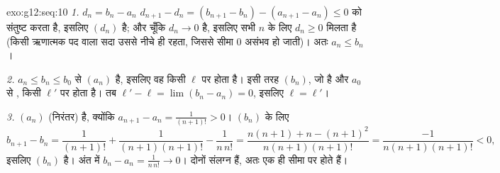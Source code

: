 \begin{solution}{exo:g12:seq:10}
\emph{1.}  $d_n = b_n - a_n$ $d_{n+1} - d_n = (b_{n+1} - b_n) - (a_{n+1} - a_n) \leq 0$ को संतुष्ट करता है, इसलिए $(d_n)$  है;
और चूँकि $d_n \to 0$ है, इसलिए सभी $n$ के लिए $d_n \geq 0$ मिलता है (किसी ऋणात्मक पद
वाला   सदा उससे नीचे ही रहता, जिससे सीमा $0$ असंभव हो
जाती)। अतः $a_n \leq b_n$।

\emph{2.} $a_n \leq b_n \leq b_0$ से   $(a_n)$  है, इसलिए वह किसी $\ell$
पर  होता है। इसी तरह $(b_n)$, जो  है और $a_0$ से ,
किसी $\ell'$ पर  होता है। तब $\ell' - \ell = \lim (b_n - a_n) = 0$, इसलिए $\ell = \ell'$।

\emph{3.} $(a_n)$ (निरंतर)  है, क्योंकि $a_{n+1} - a_n = \frac{1}{(n+1)!} > 0$। $(b_n)$ के लिए
\[
b_{n+1} - b_n = \frac{1}{(n+1)!} + \frac{1}{(n+1)(n+1)!} - \frac{1}{n\,n!}
= \frac{n(n+1) + n - (n+1)^2}{n(n+1)(n+1)!}
= \frac{-1}{n(n+1)(n+1)!} < 0 ,
\]
इसलिए $(b_n)$  है। अंत में $b_n - a_n = \frac{1}{n\,n!} \to 0$। दोनों  संलग्न हैं, अतः एक ही
सीमा पर  होते हैं।
\end{solution}

